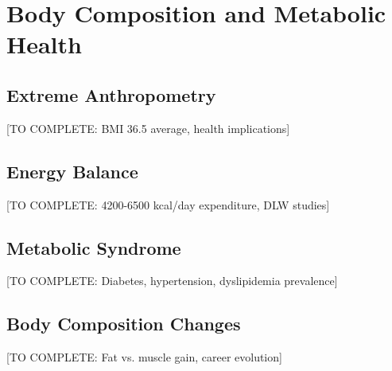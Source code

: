 \section{Body Composition and Metabolic Health}

\subsection{Extreme Anthropometry}

[TO COMPLETE: BMI 36.5 average, health implications]

\subsection{Energy Balance}

[TO COMPLETE: 4200-6500 kcal/day expenditure, DLW studies]

\subsection{Metabolic Syndrome}

[TO COMPLETE: Diabetes, hypertension, dyslipidemia prevalence]

\subsection{Body Composition Changes}

[TO COMPLETE: Fat vs. muscle gain, career evolution]